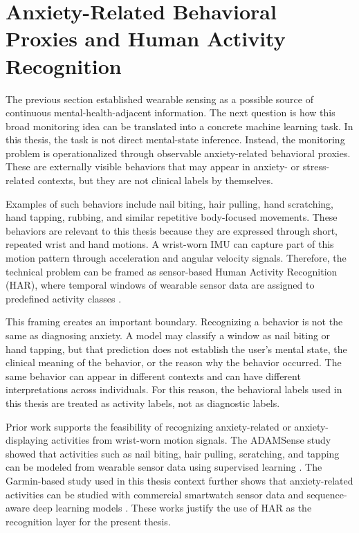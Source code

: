 \section{Anxiety-Related Behavioral Proxies and Human Activity Recognition}

The previous section established wearable sensing as a possible source of continuous mental-health-adjacent information. The next question is how this broad monitoring idea can be translated into a concrete machine learning task. In this thesis, the task is not direct mental-state inference. Instead, the monitoring problem is operationalized through observable anxiety-related behavioral proxies. These are externally visible behaviors that may appear in anxiety- or stress-related contexts, but they are not clinical labels by themselves.

Examples of such behaviors include nail biting, hair pulling, hand scratching, hand tapping, rubbing, and similar repetitive body-focused movements. These behaviors are relevant to this thesis because they are expressed through short, repeated wrist and hand motions. A wrist-worn IMU can capture part of this motion pattern through acceleration and angular velocity signals. Therefore, the technical problem can be framed as sensor-based Human Activity Recognition (HAR), where temporal windows of wearable sensor data are assigned to predefined activity classes \cite{lara2013survey,bulling2014tutorial,bao2004activity}.

This framing creates an important boundary. Recognizing a behavior is not the same as diagnosing anxiety. A model may classify a window as nail biting or hand tapping, but that prediction does not establish the user's mental state, the clinical meaning of the behavior, or the reason why the behavior occurred. The same behavior can appear in different contexts and can have different interpretations across individuals. For this reason, the behavioral labels used in this thesis are treated as activity labels, not as diagnostic labels.

Prior work supports the feasibility of recognizing anxiety-related or anxiety-displaying activities from wrist-worn motion signals. The ADAMSense study showed that activities such as nail biting, hair pulling, scratching, and tapping can be modeled from wearable sensor data using supervised learning \cite{khan2021adamsense}. The Garmin-based study used in this thesis context further shows that anxiety-related activities can be studied with commercial smartwatch sensor data and sequence-aware deep learning models \cite{oleh2025recognition}. These works justify the use of HAR as the recognition layer for the present thesis.

